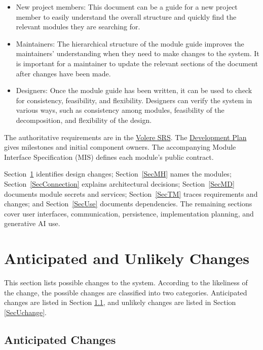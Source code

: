 \documentclass[12pt, titlepage]{article}
\begin{document}
\begin{itemize}
\item New project members: This document can be a guide for a new project member
  to easily understand the overall structure and quickly find the
  relevant modules they are searching for.
\item Maintainers: The hierarchical structure of the module guide improves the
  maintainers' understanding when they need to make changes to the system. It is
  important for a maintainer to update the relevant sections of the document
  after changes have been made.
\item Designers: Once the module guide has been written, it can be used to
  check for consistency, feasibility, and flexibility. Designers can verify the
  system in various ways, such as consistency among modules, feasibility of the
  decomposition, and flexibility of the design.
\end{itemize}

The authoritative requirements are in the
\href{https://github.com/rhea333/LingoLyrics/blob/main/docs/SRS-Volere/SRS.tex}
{Volere SRS}. The
\href{https://github.com/rhea333/LingoLyrics/blob/main/docs/DevelopmentPlan/DevelopmentPlan.tex}
{Development Plan} gives milestones and initial component owners. The
accompanying Module Interface Specification (MIS) defines each module's
public contract.

Section~\ref{SecChange} identifies design changes; Section~\ref{SecMH}
names the modules; Section~\ref{SecConnection} explains architectural
decisions; Section~\ref{SecMD} documents module secrets and services;
Section~\ref{SecTM} traces requirements and changes; and
Section~\ref{SecUse} documents dependencies. The remaining sections cover
user interfaces, communication, persistence, implementation planning, and
generative AI use.

\section{Anticipated and Unlikely Changes} \label{SecChange}

This section lists possible changes to the system. According to the likeliness
of the change, the possible changes are classified into two
categories. Anticipated changes are listed in Section \ref{SecAchange}, and
unlikely changes are listed in Section \ref{SecUchange}.

\subsection{Anticipated Changes} \label{SecAchange}
\end{document}
